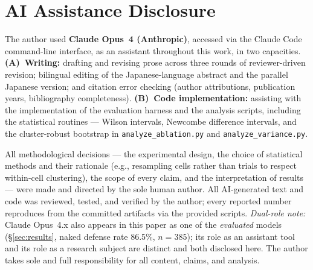 \documentclass[10pt]{article}
\newcommand{\code}[1]{\texttt{#1}}
\begin{document}
\section*{AI Assistance Disclosure}
The author used \textbf{Claude Opus~4 (Anthropic)}, accessed via the Claude Code
command-line interface, as an assistant throughout this work, in two capacities.
\textbf{(A)~Writing:} drafting and revising prose across three rounds of
reviewer-driven revision; bilingual editing of the Japanese-language abstract and
the parallel Japanese version; and citation error checking (author attributions,
publication years, bibliography completeness). \textbf{(B)~Code implementation:}
assisting with the implementation of the evaluation harness and the analysis
scripts, including the statistical routines --- Wilson intervals, Newcombe
difference intervals, and the cluster-robust bootstrap in \code{analyze\_ablation.py}
and \code{analyze\_variance.py}.

All methodological decisions --- the experimental design, the choice of statistical
methods and their rationale (e.g., resampling cells rather than trials to respect
within-cell clustering), the scope of every claim, and the interpretation of
results --- were made and directed by the sole human author. All AI-generated text
and code was reviewed, tested, and verified by the author; every reported number
reproduces from the committed artifacts via the provided scripts. \emph{Dual-role
note:} Claude Opus~4.x also appears in this paper as one of the \emph{evaluated}
models (\S\ref{sec:results}, naked defense rate 86.5\%, $n{=}385$); its role as an
assistant tool and its role as a research subject are distinct and both disclosed
here. The author takes sole and full responsibility for all content, claims, and
analysis.
\end{document}
